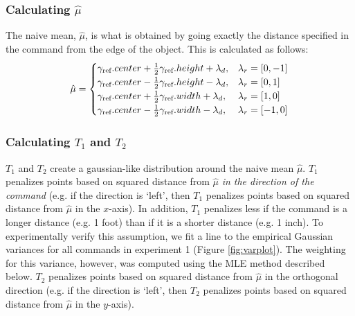 \documentclass[12pt,letterpaper]{article}
\newcommand\refobj{\textmd{ref}}
\begin{document}
\subsubsection*{Calculating $\hat{\mu}$}
The naive mean, $\hat{\mu}$, is what is obtained by going exactly the distance specified in the command from the edge of the object. This is calculated as follows:
\[
\hat{\mu} = \begin{cases} 
\gamma_\refobj.center + \frac{1}{2}\gamma_\refobj.height + \lambda_d, & \lambda_r = [0, -1] \\
\gamma_\refobj.center - \frac{1}{2}\gamma_\refobj.height - \lambda_d, & \lambda_r = [0, 1] \\
\gamma_\refobj.center + \frac{1}{2}\gamma_\refobj.width + \lambda_d, & \lambda_r = [1, 0] \\
\gamma_\refobj.center - \frac{1}{2}\gamma_\refobj.width - \lambda_d, & \lambda_r = [-1, 0] 
\end{cases}
\]

\subsubsection*{Calculating $T_1$ and $T_2$}
$T_1$ and $T_2$ create a gaussian-like distribution around the naive mean $\hat{\mu}$. $T_1$ penalizes points based on squared distance from $\hat{\mu}$ \emph{in the direction of the command} (e.g. if the direction is `left', then $T_1$ penalizes points based on squared distance from $\hat{\mu}$ in the $x$-axis). In addition, $T_1$ penalizes less if the command is a longer distance (e.g. 1 foot) than if it is a shorter distance (e.g. 1 inch). To experimentally verify this assumption, we fit a line to the empirical Gaussian variances for all commands in experiment 1 (Figure \ref{fig:varplot}). The weighting for this variance, however, was computed using the MLE method described below. $T_2$ penalizes points based on squared distance from $\hat{\mu}$ in the orthogonal direction (e.g. if the direction is `left', then $T_2$ penalizes points based on squared distance from $\hat{\mu}$ in the $y$-axis). \\
\end{document}
